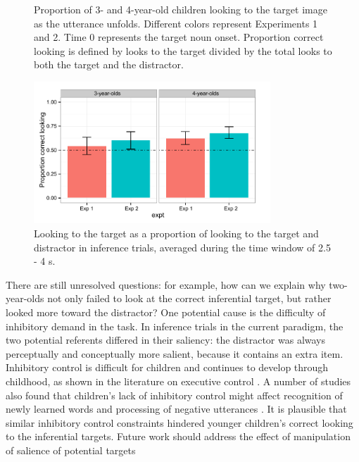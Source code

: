 \documentclass[10pt,letterpaper]{article}
\begin{document}
\begin{figure}[t]
	\caption{\label{fig:pros0} Proportion of 3- and 4-year-old children looking to the target image as the utterance unfolds. Different colors represent Experiments 1 and 2. Time 0 represents the target noun onset. Proportion correct looking is defined by looks to the target divided by the total looks to both the target and the distractor.}
\end{figure}

\begin{figure}
\begin{center} 
\includegraphics[width=3.5in]{figures/simpimp0pros-bar_inf.pdf}
\caption{\label{fig:0prosbar} Looking to the target as a proportion of looking to the target and distractor in inference trials, averaged during the time window of 2.5 - 4 s.}
\end{center} 
\end{figure}

There are still unresolved questions: for example, how can we explain why two-year-olds not only failed to look at the correct inferential target, but rather looked more toward the distractor? One potential cause is the difficulty of inhibitory demand in the task. In inference trials in the current paradigm, the two potential referents differed in their saliency: the distractor was always perceptually and conceptually more salient, because it contains an extra item. Inhibitory control is difficult for children and continues to develop through childhood, as shown in the literature on executive control \cite{davidson2006development, gerardi2000sensitivity}. A number of studies also found that children's lack of inhibitory control might affect recognition of newly learned words \cite{yurovskybeyond} and processing of negative utterances \cite{nordmeyer2013measuring}. It is plausible that similar inhibitory control constraints hindered younger children's correct looking to the inferential targets. Future work should address the effect of manipulation of salience of potential targets
\end{document}
